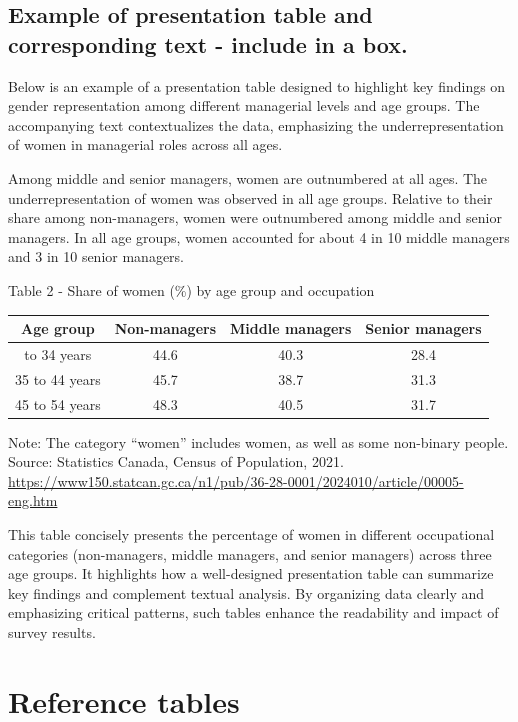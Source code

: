 \documentclass[
  12pt,
]{book}
\begin{document}
\hypertarget{example-of-presentation-table-and-corresponding-text---include-in-a-box.}{%
\subsection{Example of presentation table and corresponding text - include in a box.}\label{example-of-presentation-table-and-corresponding-text---include-in-a-box.}}

Below is an example of a presentation table designed to highlight key findings on gender representation among different managerial levels and age groups. The accompanying text contextualizes the data, emphasizing the underrepresentation of women in managerial roles across all ages.

Among middle and senior managers, women are outnumbered at all ages. The underrepresentation of women was observed in all age groups. Relative to their share among non-managers, women were outnumbered among middle and senior managers. In all age groups, women accounted for about 4 in 10 middle managers and 3 in 10 senior managers.

Table 2 - Share of women (\%) by age group and occupation

\begin{longtable}[]{@{}cccc@{}}
\toprule\noalign{}
Age group & Non-managers & Middle managers & Senior managers \\
\midrule\noalign{}
\endhead
\bottomrule\noalign{}
\endlastfoot
25 to 34 years & 44.6 & 40.3 & 28.4 \\
35 to 44 years & 45.7 & 38.7 & 31.3 \\
45 to 54 years & 48.3 & 40.5 & 31.7 \\
\end{longtable}

Note: The category ``women'' includes women, as well as some non-binary people. Source: Statistics Canada, Census of Population, 2021. \url{https://www150.statcan.gc.ca/n1/pub/36-28-0001/2024010/article/00005-eng.htm}

This table concisely presents the percentage of women in different occupational categories (non-managers, middle managers, and senior managers) across three age groups. It highlights how a well-designed presentation table can summarize key findings and complement textual analysis. By organizing data clearly and emphasizing critical patterns, such tables enhance the readability and impact of survey results.

\hypertarget{reference-tables}{%
\section{Reference tables}\label{reference-tables}}
\end{document}
